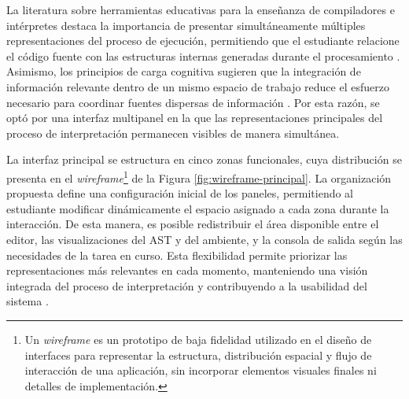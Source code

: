 La literatura sobre herramientas educativas para la enseñanza de compiladores e intérpretes destaca la importancia de presentar simultáneamente múltiples representaciones del proceso de ejecución, permitiendo que el estudiante relacione el código fuente con las estructuras internas generadas durante el procesamiento \cite{jovanovic2021comvis,Stamenkovic2024AWE,Spigariol2023Aprendiendo}. Asimismo, los principios de carga cognitiva sugieren que la integración de información relevante dentro de un mismo espacio de trabajo reduce el esfuerzo necesario para coordinar fuentes dispersas de información \cite{sweller2024cognitive}. Por esta razón, se optó por una interfaz multipanel en la que las representaciones principales del proceso de interpretación permanecen visibles de manera simultánea.

La interfaz principal se estructura en cinco zonas funcionales, cuya distribución se presenta en el \textit{wireframe}\footnote{Un \textit{wireframe} es un prototipo de baja fidelidad utilizado en el diseño de interfaces para representar la estructura, distribución espacial y flujo de interacción de una aplicación, sin incorporar elementos visuales finales ni detalles de implementación.} de la Figura \ref{fig:wireframe-principal}. La organización propuesta define una configuración inicial de los paneles, permitiendo al estudiante modificar dinámicamente el espacio asignado a cada zona durante la interacción. De esta manera, es posible redistribuir el área disponible entre el editor, las visualizaciones del AST y del ambiente, y la consola de salida según las necesidades de la tarea en curso. Esta flexibilidad permite priorizar las representaciones más relevantes en cada momento, manteniendo una visión integrada del proceso de interpretación y contribuyendo a la usabilidad del sistema \cite{lu2022usability}.

